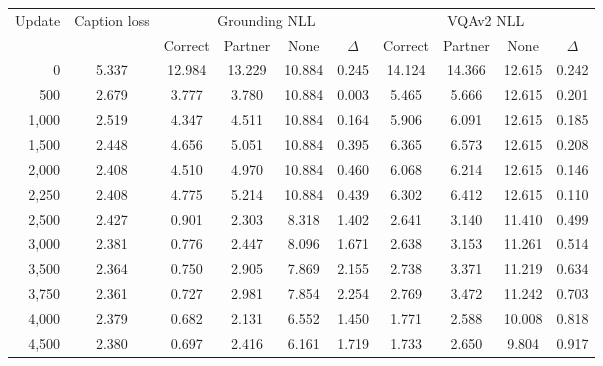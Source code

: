 \begin{tabular}{rccccccccc}
\toprule
Update & Caption loss & \multicolumn{4}{c}{Grounding NLL} & \multicolumn{4}{c}{VQAv2 NLL} \\ \cmidrule(lr){3-6}\cmidrule(lr){7-10}
 & & Correct & Partner & None & $\Delta$ & Correct & Partner & None & $\Delta$ \\
\midrule
0 & 5.337 & 12.984 & 13.229 & 10.884 & 0.245 & 14.124 & 14.366 & 12.615 & 0.242 \\
500 & 2.679 & 3.777 & 3.780 & 10.884 & 0.003 & 5.465 & 5.666 & 12.615 & 0.201 \\
1,000 & 2.519 & 4.347 & 4.511 & 10.884 & 0.164 & 5.906 & 6.091 & 12.615 & 0.185 \\
1,500 & 2.448 & 4.656 & 5.051 & 10.884 & 0.395 & 6.365 & 6.573 & 12.615 & 0.208 \\
2,000 & 2.408 & 4.510 & 4.970 & 10.884 & 0.460 & 6.068 & 6.214 & 12.615 & 0.146 \\
2,250 & 2.408 & 4.775 & 5.214 & 10.884 & 0.439 & 6.302 & 6.412 & 12.615 & 0.110 \\
2,500 & 2.427 & 0.901 & 2.303 & 8.318 & 1.402 & 2.641 & 3.140 & 11.410 & 0.499 \\
3,000 & 2.381 & 0.776 & 2.447 & 8.096 & 1.671 & 2.638 & 3.153 & 11.261 & 0.514 \\
3,500 & 2.364 & 0.750 & 2.905 & 7.869 & 2.155 & 2.738 & 3.371 & 11.219 & 0.634 \\
3,750 & 2.361 & 0.727 & 2.981 & 7.854 & 2.254 & 2.769 & 3.472 & 11.242 & 0.703 \\
4,000 & 2.379 & 0.682 & 2.131 & 6.552 & 1.450 & 1.771 & 2.588 & 10.008 & 0.818 \\
4,500 & 2.380 & 0.697 & 2.416 & 6.161 & 1.719 & 1.733 & 2.650 & 9.804 & 0.917 \\
\bottomrule
\end{tabular}